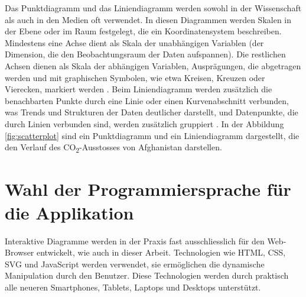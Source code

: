 Das Punktdiagramm und das Liniendiagramm werden sowohl in der Wissenschaft als auch in den Medien oft verwendet. In diesen Diagrammen werden Skalen in der Ebene oder im Raum festgelegt, die ein Koordinatensystem beschreiben. Mindestens eine Achse dient als Skala der unabhängigen Variablen (der Dimension, die den Beobachtungsraum der Daten aufspannen). Die restlichen Achsen dienen als Skala der abhängigen Variablen, Ausprägungen, die abgetragen werden und mit graphischen Symbolen, wie etwa Kreisen, Kreuzen oder Vierecken, markiert werden \cite[Kapitel 5.2]{viz}. Beim Liniendiagramm werden zusätzlich die benachbarten Punkte durch eine Linie oder einen Kurvenabschnitt verbunden, was Trends und Strukturen der Daten deutlicher darstellt, und Datenpunkte, die durch Linien verbunden sind, werden zusätzlich gruppiert \cite[Kapitel 5.2]{viz}. In der Abbildung \ref{fig:scatterplot} sind ein Punktdiagramm und ein Liniendiagramm dargestellt, die den Verlauf des CO\textsubscript{2}-Ausstosses von Afghanistan darstellen.

\section{Wahl der Programmiersprache für die Applikation}

Interaktive Diagramme werden in der Praxis fast ausschliesslich für den Web-Browser entwickelt, wie auch in dieser Arbeit. Technologien wie HTML, CSS, SVG und JavaScript werden verwendet, sie ermöglichen die dynamische Manipulation durch den Benutzer. Diese Technologien werden durch praktisch alle neueren Smartphones, Tablets, Laptops und Desktops unterstützt.
